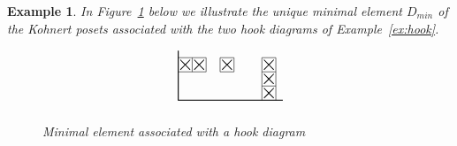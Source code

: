 \documentclass[letterpaper,10pt]{article}
\newtheorem{ex}[theorem]{Example}
\newtheorem{prop}[theorem]{Proposition}
\begin{document}
\begin{ex}\label{ex:hookmin}
    In Figure~\ref{fig:hookmin} below we illustrate the unique minimal element $D_{min}$ of the Kohnert posets associated with the two hook diagrams of Example~\ref{ex:hook}.

    \begin{figure}[H]
        \centering
        $$\begin{tikzpicture}[scale=0.4]
    \draw[thick] (7.5,0)--(0,0)--(0,3.5);
        \draw (0,2)--(2,2)--(2,3)--(0,3);
        \draw (1,2)--(1,3);
        \node at (1.5,2.5){$\bigtimes$};
        \node at (0.5,2.5){$\bigtimes$};

        \draw (3,2)--(4,2)--(4,3)--(3,3)--(3,2);
        \node at (3.5,2.5){$\bigtimes$};

        \draw (7,0)--(7,3)--(6,3)--(6,0);
        \draw (6,1)--(7,1);
        \draw (6,2)--(7,2);
        \node at (6.5,0.5){$\bigtimes$};
        \node at (6.5,1.5){$\bigtimes$};
        \node at (6.5,2.5){$\bigtimes$};
\end{tikzpicture}$$
        \caption{Minimal element associated with a hook diagram}
        \label{fig:hookmin}
    \end{figure}
\end{ex}


\end{document}
